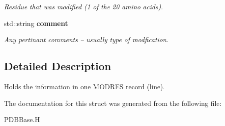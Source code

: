 \begin{CompactItemize}
\begin{CompactList}\small\item\em Residue that was modified (1 of the 20 amino acids). \item\end{CompactList}\item 
std::string \bf{comment}\label{structASCbase_1_1PDBBase_1_1modres__record__type_765eead7dea06482d5b3fe2dbcd4eed0}

\begin{CompactList}\small\item\em Any pertinant comments -- usually type of modfication. \item\end{CompactList}\end{CompactItemize}


\subsection{Detailed Description}
Holds the information in one MODRES record (line). 



The documentation for this struct was generated from the following file:\begin{CompactItemize}
\item 
PDBBase.H\end{CompactItemize}
